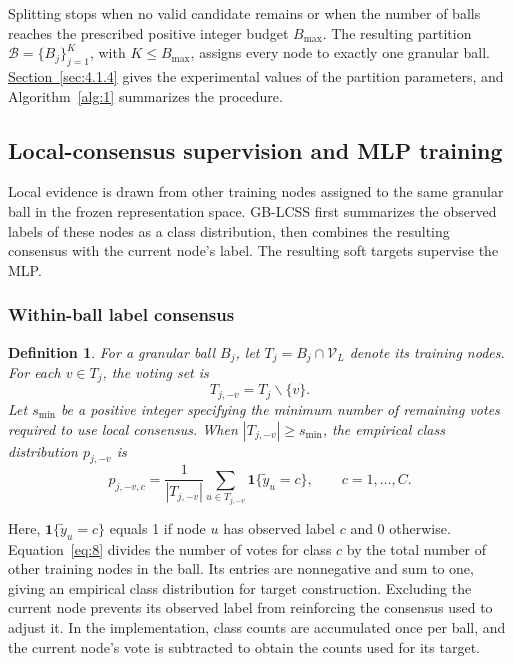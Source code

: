 \documentclass[10pt,letterpaper,nopreprintline]{elsarticle}
\theoremstyle{plain}
\newtheorem{definition}{Definition}
\begin{document}
Splitting stops when no valid candidate remains or when the number of balls reaches the prescribed positive integer budget \(B_{\max}\). The resulting partition \(\mathcal{B} = \{ B_{j}\}_{j = 1}^{K}\), with \(K \leq B_{\max}\), assigns every node to exactly one granular ball. \hyperref[sec:4.1.4]{Section~\ref*{sec:4.1.4}} gives the experimental values of the partition parameters, and Algorithm~\ref{alg:1} summarizes the procedure.



\subsection{Local-consensus supervision and MLP training}\label{sec:3.3}

Local evidence is drawn from other training nodes assigned to the same granular ball in the frozen representation space. GB-LCSS first summarizes the observed labels of these nodes as a class distribution, then combines the resulting consensus with the current node's label. The resulting soft targets supervise the MLP.

\subsubsection{Within-ball label consensus}\label{sec:3.3.1}

\begin{definition}
For a granular ball \(B_{j}\), let \(T_{j} = B_{j} \cap \mathcal{V}_{L}\) denote its training nodes. For each \(v \in T_{j}\), the voting set is
\begin{equation}\label{eq:7}
T_{j, - v} = T_{j}\backslash\{ v\}.
\end{equation}
Let \(s_{\min}\) be a positive integer specifying the minimum number of remaining votes required to use local consensus. When \(\left| T_{j, - v} \right| \geq s_{\min}\), the empirical class distribution \(p_{j, - v}\) is
\begin{equation}\label{eq:8}
p_{j, - v,c} = \frac{1}{|T_{j, - v}|}\sum_{u \in T_{j, - v}}{\mathbf{1}\{{\widetilde{y}}_{u} = c\}},\quad\quad c = 1,\ldots,C.
\end{equation}
\end{definition}

Here, \(\mathbf{1}\{\widetilde y_u=c\}\) equals 1 if node \(u\) has observed label \(c\) and 0 otherwise. Equation~\eqref{eq:8} divides the number of votes for class \(c\) by the total number of other training nodes in the ball. Its entries are nonnegative and sum to one, giving an empirical class distribution for target construction. Excluding the current node prevents its observed label from reinforcing the consensus used to adjust it. In the implementation, class counts are accumulated once per ball, and the current node's vote is subtracted to obtain the counts used for its target.
\end{document}
